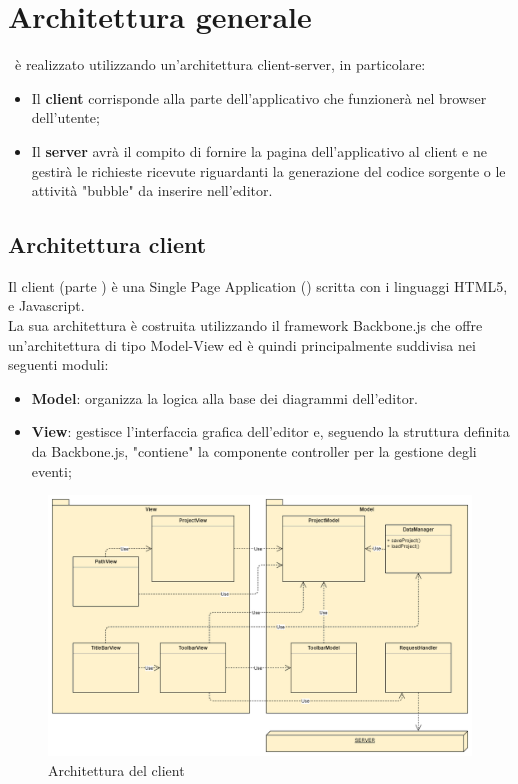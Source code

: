 \documentclass[../PianoDiQualifica.tex]{subfiles}
\begin{document}
	\section{Architettura generale}
		\progetto\ è realizzato utilizzando un'architettura client-server, in particolare:
		\begin{itemize}
			\item Il \textbf{client} corrisponde alla parte dell'applicativo che funzionerà nel
			browser dell'utente;
			\item Il \textbf{server} avrà il compito di fornire la pagina dell'applicativo al client
			e ne gestirà le richieste ricevute riguardanti la generazione del codice sorgente o le
			attività "bubble" da inserire nell'editor.
		\end{itemize}
		\subsection{Architettura client}
			Il client (parte ) è una Single Page Application () scritta con i linguaggi
			HTML5,  e Javascript.\\
			La sua architettura è costruita utilizzando il framework Backbone.js che offre
			un'architettura di tipo Model-View ed è quindi principalmente suddivisa nei seguenti moduli:
			\begin{itemize}
				\item \textbf{Model}: organizza la logica alla base dei diagrammi dell'editor.
				\item \textbf{View}: gestisce l'interfaccia grafica dell'editor e, seguendo la struttura
				definita da Backbone.js, "contiene" la componente controller per la gestione
				degli eventi; 
			\end{itemize}
			\begin{figure}[H]\label{fig:ClientSubsystem}
				\centering
				\includegraphics[scale=0.46]{Immagini/DiagrammaArchitettura/ClientSubsystem.png}
				\caption{Architettura del client}
			\end{figure}
\end{document}
